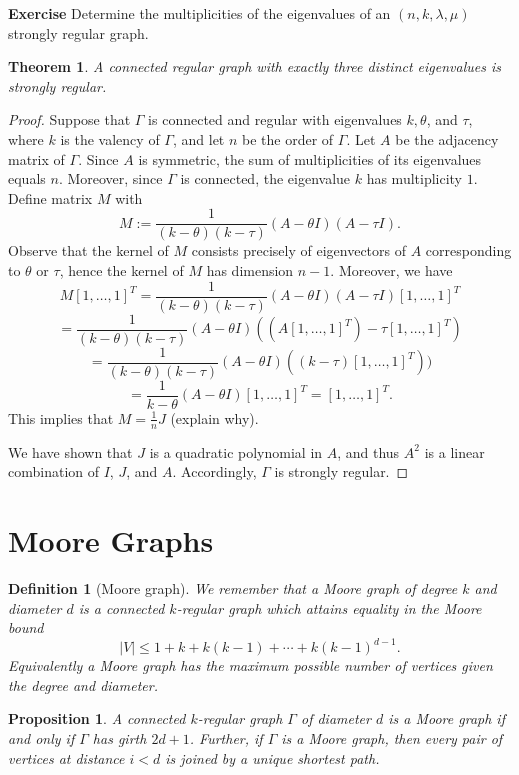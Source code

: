 \documentclass[12pt,a4paper,openany]{book}
\newtheorem{theorem}{Theorem}[section]
\newtheorem{definition}{Definition}[section]
\newtheorem{proposition}{Proposition}[section]
\begin{document}
\bigskip\noindent\textbf{Exercise}
Determine the multiplicities of the eigenvalues of an $(n, k, \lambda, \mu)$ strongly regular graph.


\begin{theorem}
A connected regular graph with exactly three distinct eigenvalues is strongly regular.
\end{theorem}

\begin{proof}
Suppose that $\Gamma$ is connected and regular with eigenvalues $k, \theta$, and $\tau$, where $k$ is the valency of $\Gamma$, and let $n$ be the order of $\Gamma$. Let $A$ be the adjacency matrix of $\Gamma$. Since $A$ is symmetric, the sum of multiplicities of its eigenvalues equals $n$. Moreover, since $\Gamma$ is connected, the eigenvalue $k$ has multiplicity $1$. Define matrix $M$ with
\[
M := \frac{1}{(k - \theta)(k - \tau)} (A - \theta I)(A - \tau I).
\]
Observe that the kernel of $M$ consists precisely of eigenvectors of $A$ corresponding to $\theta$ or $\tau$, hence the kernel of $M$ has dimension $n - 1$. Moreover, we have
\[
M [1, \dots, 1]^T = \frac{1}{(k - \theta)(k - \tau)} (A - \theta I)(A - \tau I) [1, \dots, 1]^T
\]
\[
= \frac{1}{(k - \theta)(k - \tau)} (A - \theta I)((A [1, \dots, 1]^T) - \tau [1, \dots, 1]^T)
\]
\[
= \frac{1}{(k - \theta)(k - \tau)} (A - \theta I)((k - \tau) [1, \dots, 1]^T)) 
\]
\[
= \frac{1}{k - \theta} (A - \theta I) [1, \dots, 1]^T = [1, \dots, 1]^T.
\]
This implies that $M = \frac{1}{n} J$ (explain why).

We have shown that $J$ is a quadratic polynomial in $A$, and thus $A^2$ is a linear combination of $I$, $J$, and $A$. Accordingly, $\Gamma$ is strongly regular.
\end{proof}
\section{Moore Graphs}

\begin{definition}[Moore graph]
We remember that a \emph{Moore graph} of degree \(k\) and diameter \(d\) is a connected
\(k\)-regular graph which attains equality in the Moore bound
\[
|V| \le 1 + k + k(k-1) + \cdots + k(k-1)^{d-1}.
\]
Equivalently a Moore graph has the maximum possible number of vertices
given the degree and diameter.  
\end{definition}

\begin{proposition}\label{moore-girth}
A connected $k$-regular graph $\Gamma$ of diameter $d$ is a Moore graph if and only if $\Gamma$ has girth $2d+1$. Further, if $\Gamma$ is a Moore graph, then every pair of vertices at distance $i<d$ is joined by a unique shortest path.

\end{proposition}
\end{document}
